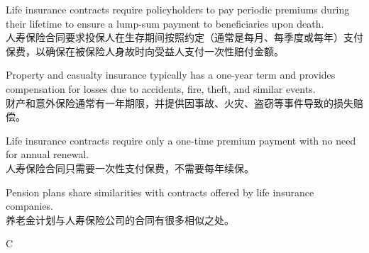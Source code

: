 \documentclass{article}
\begin{document}
\begin{choices}
    \item Life insurance contracts require policyholders to pay periodic premiums during their lifetime to ensure a lump-sum payment to beneficiaries upon death.\\
    人寿保险合同要求投保人在生存期间按照约定（通常是每月、每季度或每年）支付保费，以确保在被保险人身故时向受益人支付一次性赔付金额。
    \item Property and casualty insurance typically has a one-year term and provides compensation for losses due to accidents, fire, theft, and similar events.\\财产和意外保险通常有一年期限，并提供因事故、火灾、盗窃等事件导致的损失赔偿。
    \item Life insurance contracts require only a one-time premium payment with no need for annual renewal.\\
    人寿保险合同只需要一次性支付保费，不需要每年续保。
    \item Pension plans share similarities with contracts offered by life insurance companies.\\
    养老金计划与人寿保险公司的合同有很多相似之处。
\end{choices}

\begin{correctanswer}
    C
\end{correctanswer}
\end{document}
